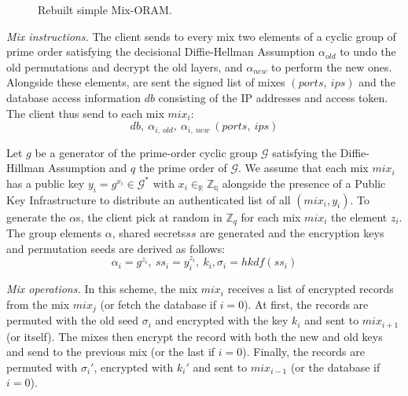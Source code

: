 \documentclass[USenglish,oneside,twocolumn]{article}
\begin{document}
\begin{figure}[H]
\begin{minipage}{0.475\textwidth}
\begin{adjustbox}{width=\textwidth}
\end{adjustbox}
\centering
\caption{Rebuilt simple Mix-ORAM.} \label{fig:ASMO_R}
\end{minipage}
\end{figure} 
%
\noindent\textit{Mix instructions.}
The client sends to every mix two elements of a cyclic group of prime order satisfying the decisional Diffie-Hellman Assumption $\alpha_{old}$ to undo the old permutations and decrypt the old layers, and $\alpha_{new}$ to perform the new ones. Alongside these elements, are sent the signed list of mixes $(ports,\ ips)$ and the database access information $db$ consisting of the IP addresses and access token. The client thus send to each mix $mix_i$:
$$ db,\ \alpha_{i,\ old},\ \alpha_{i,\ new}\ (ports,\ ips) $$

Let $g$ be a generator of the prime-order cyclic group $\mathcal{G}$ satisfying the Diffie-Hillman Assumption and $q$ the prime order of $\mathcal{G}$. We assume that each mix $mix_i$ has a public key $y_i=g^{x_i}\in \mathcal{G}^*$ with $x_i \in_{\mathbb{R}} \mathbb{Z_q}$ alongside the presence of a Public Key Infrastructure to distribute an authenticated list of all $(mix_i, y_i)$.
To generate the $\alpha$s, the client pick at random in $\mathbb{Z}_q$ for each mix $mix_i$ the element $z_i$. The group elements $\alpha$, shared secrets$ss$ are generated and the encryption keys and permutation seeds are derived as follows: $$\alpha_i = g^{z_i},\ ss_i = y_i^{z_i},\ k_i, \sigma_i=hkdf(ss_i)$$


\noindent\textit{Mix operations.} In this scheme, the mix $mix_i$ receives a list of encrypted records from the mix $mix_j$ (or fetch the database if $i=0$). At first, the records are permuted with the old seed $\sigma_{i}$ and encrypted with the key $k_{i}$ and sent to $mix_{i+1}$ (or itself). The mixes then encrypt the record with both the new and old keys and send to the previous mix (or the last if $i=0$). Finally, the records are permuted with $\sigma_{i}'$, encrypted with $k_{i}'$ and sent to $mix_{i-1}$ (or the database if $i=0$).\\
\end{document}
